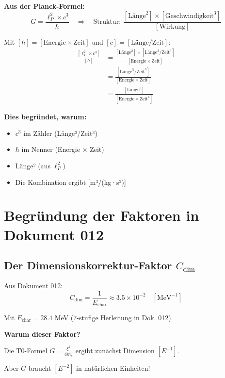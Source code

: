 	\textbf{Aus der Planck-Formel:}
	\begin{equation}
		G = \frac{\ell_P^2 \times c^3}{\hbar} \quad \Rightarrow \quad \text{Struktur: } \frac{[\text{Länge}^2] \times [\text{Geschwindigkeit}^3]}{[\text{Wirkung}]}
	\end{equation}
	
	Mit $[\hbar] = [\text{Energie} \times \text{Zeit}]$ und $[c] = [\text{Länge}/\text{Zeit}]$:
	\begin{align}
		\frac{[\ell_P^2 \times c^3]}{[\hbar]} &= \frac{[\text{Länge}^2] \times [\text{Länge}^3/\text{Zeit}^3]}{[\text{Energie} \times \text{Zeit}]} \\
		&= \frac{[\text{Länge}^5/\text{Zeit}^3]}{[\text{Energie} \times \text{Zeit}]} \\
		&= \frac{[\text{Länge}^5]}{[\text{Energie} \times \text{Zeit}^4]}
	\end{align}
	
	\textbf{Dies begründet, warum:}
	\begin{itemize}
		\item $c^3$ im Zähler (Länge³/Zeit³)
		\item $\hbar$ im Nenner (Energie × Zeit)
		\item Länge² (aus $\ell_P^2$)
		\item Die Kombination ergibt [m³/(kg·s²)]
	\end{itemize}
	
	\section{Begründung der Faktoren in Dokument 012}
	
	\subsection{Der Dimensionskorrektur-Faktor $C_{\text{dim}}$}
	
	Aus Dokument 012:
	\begin{equation}
		C_{\text{dim}} = \frac{1}{E_{\text{char}}} \approx 3.5 \times 10^{-2} \quad [\text{MeV}^{-1}]
	\end{equation}
	
	Mit $E_{\text{char}} = 28.4$ MeV (7-stufige Herleitung in Dok. 012).
	
	\textbf{Warum dieser Faktor?}
	
	Die T0-Formel $G = \frac{\xi^2}{4m_e}$ ergibt zunächst Dimension $[E^{-1}]$.
	
	Aber $G$ braucht $[E^{-2}]$ in natürlichen Einheiten!
	
